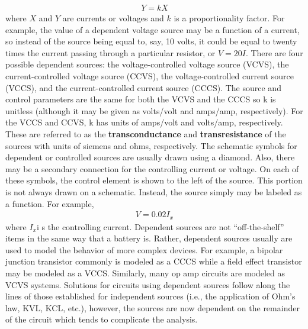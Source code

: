 \documentclass{report}
\begin{document}
\begin{itemize}
            \begin{align*}
                Y = kX
            \end{align*}
            where $X$ and $Y$ are currents or voltages and $k$ is a proportionality factor. For example, the value of a dependent voltage source may be a function of a current, so instead of the source being equal to, say, 10 volts, it could be equal to twenty times the current passing through a particular resistor, or $V=20I$.
            \bigbreak \noindent 
            There are four possible dependent sources: the voltage-controlled voltage source (VCVS), the current-controlled voltage source (CCVS), the voltage-controlled current source (VCCS), and the current-controlled current source (CCCS).
            \bigbreak \noindent 
            The source and control parameters are the same for both the VCVS and the CCCS so k is unitless (although it may be given as volts/volt and amps/amp, respectively). For the VCCS and CCVS, k has units of amps/volt and volts/amp, respectively. These are referred to as the \textbf{transconductance} and \textbf{transresistance} of the sources with units of siemens and ohms, respectively.
            \bigbreak \noindent 
            The schematic symbols for dependent or controlled sources are usually drawn using a diamond. Also, there may be a secondary connection for the controlling current or voltage.
            \bigbreak \noindent 
            \bigbreak \noindent 
            On each of these symbols, the control element is shown to the left of the source. This portion is not always drawn on a schematic. Instead, the source simply may be labeled as a function. For example,
            \begin{align*}
                V = 0.02 I_{x}
            \end{align*}
            where $I_{x}$i s the controlling current. Dependent sources are not “off-the-shelf” items in the same way that a battery is. Rather, dependent sources usually are used to model the behavior of more complex devices. For example, a bipolar junction transistor commonly is modeled as a CCCS while a field effect transistor may be modeled as a VCCS.
            \bigbreak \noindent 
            Similarly, many op amp circuits are modeled as VCVS systems. Solutions for circuits using dependent sources follow along the lines of those established for independent sources (i.e., the application of Ohm's law, KVL, KCL, etc.), however, the sources are now dependent on the remainder of the circuit which tends to complicate the analysis.

\end{itemize}
\end{document}
